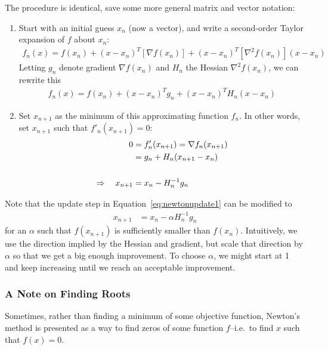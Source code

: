 \documentclass[a4paper,12pt]{scrartcl}
\theoremstyle{definition}
\theoremstyle{remark}
\begin{document}
The procedure is identical, save some more general matrix and vector
notation:
\begin{enumerate}
  \item Start with an initial guess $x_n$ (now a vector), and write a
    second-order Taylor expansion of $f$ about $x_n$:
    \begin{align*}
      f_n(x) = f(x_n) + (x-x_n)^T \left[\nabla f(x_n)\right]
        + (x-x_n)^T \left[\nabla^2 f(x_n)\right](x-x_n)
    \end{align*}
    Letting $g_n$ denote gradient $\nabla f(x_n)$ and $H_n$ the Hessian
    $\nabla^2 f(x_n)$, we can rewrite this
    \begin{align}
      f_n(x) = f(x_n) + (x-x_n)^T g_n + (x-x_n)^T H_n(x-x_n)
      \label{eq:newtonapprox}
    \end{align}
  \item Set $x_{n+1}$ as the minimum of this approximating function
    $f_n$. In other words, set $x_{n+1}$ such that $f'_n(x_{n+1})=0$:
    \begin{align}
      0 &= f'_n(x_{n+1}) = \nabla f_n(x_{n+1})\notag\\
      &= g_n + H_n (x_{n+1}-x_n)\notag\\\notag\\
      \Rightarrow \quad
      x_{n+1} &= x_n - H_n^{-1} g_n \label{eq:newtonupdate1}
    \end{align}
\end{enumerate}
Note that the update step in Equation~\ref{eq:newtonupdate1} can be
modified to
\begin{align}
  x_{n+1} &= x_n - \alpha H_n^{-1} g_n \label{eq:newtonupdate2}
\end{align}
for an $\alpha$ such that $f(x_{n+1})$ is sufficiently smaller than
$f(x_n)$. Intuitively, we use the direction implied by the Hessian and
gradient, but scale that direction by $\alpha$ so that we get a big
enough improvement. To choose $\alpha$, we might start at 1 and keep
increasing until we reach an acceptable improvement.

\subsubsection{A Note on Finding Roots}

Sometimes, rather than finding a minimum of some objective function,
Newton's method is presented as a way to find zeros of some function
$f$--i.e.\ to find $x$ such that $f(x)=0$.
\end{document}
